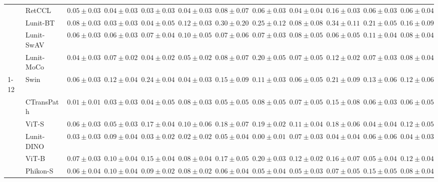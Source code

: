 \begin{tabular}{ll|cccc|c|cccc|c}
 & RetCCL~\cite{wang2023retccl} & $0.05 \pm 0.03$ & $0.04 \pm 0.03$ & $0.03 \pm 0.03$ & $0.04 \pm 0.03$ & $0.08 \pm 0.07$ & $0.06 \pm 0.03$ & $\mathbf{0.04 \pm 0.04}$ & $0.16 \pm 0.03$ & $0.06 \pm 0.03$ & $0.06 \pm 0.04$ \\
 & Lunit-BT~\cite{kang2023benchmarking} & $0.08 \pm 0.03$ & $0.03 \pm 0.03$ & $0.04 \pm 0.05$ & $0.12 \pm 0.03$ & $0.30 \pm 0.20$ & $0.25 \pm 0.12$ & $0.08 \pm 0.08$ & $0.34 \pm 0.11$ & $0.21 \pm 0.05$ & $0.16 \pm 0.09$ \\
 & Lunit-SwAV~\cite{kang2023benchmarking} & $0.06 \pm 0.03$ & $0.06 \pm 0.03$ & $0.07 \pm 0.04$ & $0.10 \pm 0.05$ & $0.07 \pm 0.06$ & $0.07 \pm 0.03$ & $0.08 \pm 0.05$ & $0.06 \pm 0.05$ & $0.11 \pm 0.04$ & $0.08 \pm 0.04$ \\
 & Lunit-MoCo~\cite{kang2023benchmarking} & $0.04 \pm 0.03$ & $0.07 \pm 0.02$ & $0.04 \pm 0.02$ & $0.05 \pm 0.02$ & $0.08 \pm 0.07$ & $0.20 \pm 0.05$ & $0.07 \pm 0.05$ & $0.12 \pm 0.02$ & $0.07 \pm 0.03$ & $0.08 \pm 0.04$ \\
\cline{1-12}
\multirow[t]{12}{*}{Transformer} & Swin~\cite{liu2021swin} & $0.06 \pm 0.03$ & $0.12 \pm 0.04$ & $0.24 \pm 0.04$ & $0.04 \pm 0.03$ & $0.15 \pm 0.09$ & $0.11 \pm 0.03$ & $0.06 \pm 0.05$ & $0.21 \pm 0.09$ & $0.13 \pm 0.06$ & $0.12 \pm 0.06$ \\
 & CTransPath~\cite{wang2022transformer} & $\mathbf{0.01 \pm 0.01}$ & $\mathbf{0.03 \pm 0.03}$ & $0.04 \pm 0.05$ & $0.08 \pm 0.03$ & $0.05 \pm 0.05$ & $0.08 \pm 0.05$ & $0.07 \pm 0.05$ & $0.15 \pm 0.08$ & $0.06 \pm 0.03$ & $0.06 \pm 0.05$ \\
 & ViT-S~\cite{kolesnikov2021image} & $0.06 \pm 0.03$ & $0.05 \pm 0.03$ & $0.17 \pm 0.04$ & $0.10 \pm 0.06$ & $0.18 \pm 0.07$ & $0.19 \pm 0.02$ & $0.11 \pm 0.04$ & $0.18 \pm 0.06$ & $\mathbf{0.04 \pm 0.04}$ & $0.12 \pm 0.05$ \\
 & Lunit-DINO~\cite{kang2023benchmarking} & $0.03 \pm 0.03$ & $0.09 \pm 0.04$ & $0.03 \pm 0.02$ & $\mathbf{0.02 \pm 0.02}$ & $\mathbf{0.05 \pm 0.04}$ & $\mathbf{0.00 \pm 0.01}$ & $0.07 \pm 0.03$ & $\mathbf{0.04 \pm 0.04}$ & $0.06 \pm 0.06$ & $\mathbf{0.04 \pm 0.03}$ \\
 & ViT-B~\cite{kolesnikov2021image} & $0.07 \pm 0.03$ & $0.10 \pm 0.04$ & $0.15 \pm 0.04$ & $0.08 \pm 0.04$ & $0.17 \pm 0.05$ & $0.20 \pm 0.03$ & $0.12 \pm 0.02$ & $0.16 \pm 0.07$ & $0.05 \pm 0.04$ & $0.12 \pm 0.04$ \\
 & Phikon-S~\cite{filiot2023scaling} & $0.06 \pm 0.04$ & $0.10 \pm 0.04$ & $0.09 \pm 0.02$ & $0.08 \pm 0.02$ & $0.06 \pm 0.04$ & $0.05 \pm 0.04$ & $0.05 \pm 0.03$ & $0.07 \pm 0.05$ & $0.15 \pm 0.05$ & $0.08 \pm 0.04$ \\

\end{tabular}
